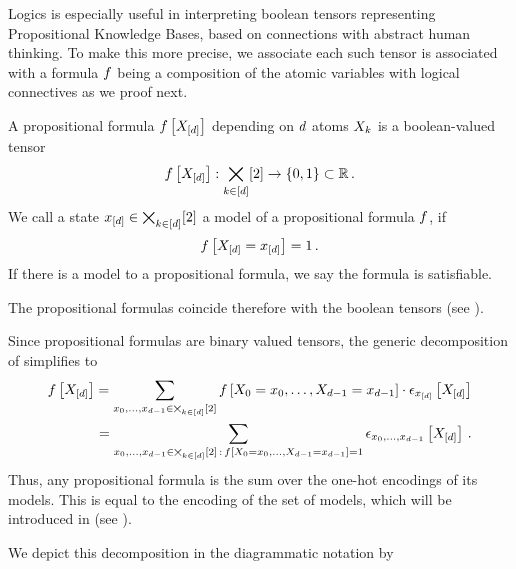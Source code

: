 
Logics is especially useful in interpreting boolean tensors representing Propositional Knowledge Bases, based on connections with abstract human thinking.
To make this more precise, we associate each such tensor is associated with a formula $f$ being a composition of the atomic variables with logical connectives as we proof next.

\begin{definition}
    \label{def:formulas}
    A propositional formula $f\left[X_{[d]}\right]$ depending on $d$ atoms $X_{k}$ is a boolean-valued tensor
    \begin{align*}
        f\left[X_{[d]}\right] : \bigtimes_{k\in[d]}[2] \rightarrow \{0,1\} \subset \mathbb{R} \, .
    \end{align*}
    We call a state $x_{[d]} \in \bigtimes_{k\in[d]}[2]$ a model of a propositional formula $f$, if
    \begin{align*}
        f\left[X_{[d]}=x_{[d]}\right]=1 \, .
    \end{align*}
    If there is a model to a propositional formula, we say the formula is satisfiable.
\end{definition}

The propositional formulas coincide therefore with the boolean tensors (see ).


Since propositional formulas are binary valued tensors, the generic decomposition of  simplifies to
\begin{align}
    \label{eq:formulaModelDecomposition}
    f\left[X_{[d]}\right] = \sum_{x_{0},\ldots,x_{d-1}\in\bigtimes_{k\in[d]}[2]} f\left[X_{0}=x_{0},\ldots,X_{d-1}=x_{d-1}\right] \cdot \epsilon_{x_{[d]}}\left[X_{[d]}\right] \\
    = \sum_{x_{0},\ldots,x_{d-1}\in\bigtimes_{k\in[d]}[2] \, : \, f\left[X_{0}=x_{0},\ldots,X_{d-1}=x_{d-1}\right]=1}  \epsilon_{x_{0},\ldots,x_{d-1}}\left[X_{[d]}\right] \, .
\end{align}
Thus, any propositional formula is the sum over the one-hot encodings of its models.
This is equal to the encoding of the set of models, which will be introduced in  (see ).

We depict this decomposition in the diagrammatic notation by
\begin{center}
    
\end{center}


